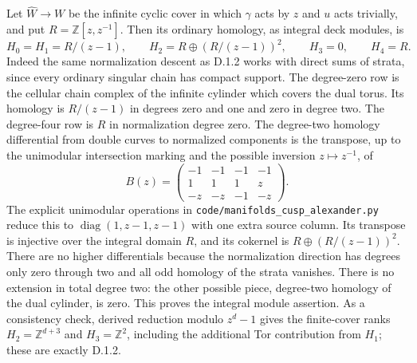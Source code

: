 Let $\widehat W\to W$ be the infinite cyclic cover in which $\gamma$
acts by $z$ and $u$ acts trivially, and put $R=\mathbb Z[z,z^{-1}]$.
Then its ordinary homology, as integral deck modules, is
\[
 H_0=H_1=R/(z-1),\qquad H_2=R\oplus(R/(z-1))^2,
 \qquad H_3=0,\qquad H_4=R.
\]
Indeed the same normalization descent as D.1.2 works with direct sums
of strata, since every ordinary singular chain has compact support.
The degree-zero row is the cellular chain complex of the infinite
cylinder which covers the dual torus. Its homology is $R/(z-1)$ in
degrees zero and one and zero in degree two. The degree-four row is
$R$ in normalization degree zero. The degree-two homology differential
from double curves to normalized components is the transpose, up to
the unimodular intersection marking and the possible inversion
$z\mapsto z^{-1}$, of
\[
 B(z)=\begin{pmatrix}-1&-1&-1&-1\\1&1&1&z\\-z&-z&-1&-z\end{pmatrix}.
\]
The explicit unimodular operations in
\texttt{code/manifolds\_cusp\_alexander.py} reduce this to
$\operatorname{diag}(1,z-1,z-1)$ with one extra source column.
Its transpose is injective over the integral domain $R$, and its
cokernel is $R\oplus(R/(z-1))^2$. There are no higher differentials
because the normalization direction has degrees only zero through two
and all odd homology of the strata vanishes. There is no extension in
total degree two: the other possible piece, degree-two homology of the
dual cylinder, is zero. This proves the integral module assertion.
As a consistency check, derived reduction modulo $z^d-1$ gives the
finite-cover ranks $H_2=\mathbb Z^{d+3}$ and $H_3=\mathbb Z^2$, including
the additional Tor contribution from $H_1$; these are exactly D.1.2.
